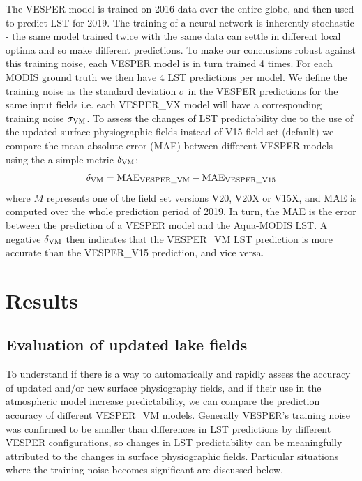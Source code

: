 \documentclass[hess, twostagejnl]{copernicus}
\begin{document}
The VESPER model is trained on 2016 data over the entire globe, and then used to predict LST for 2019. The training of a neural network is inherently stochastic - the same model trained twice with the same data can settle in different local optima and so make different predictions. To make our conclusions robust against this training noise, each VESPER model is in turn trained 4 times. For each MODIS ground truth we then have 4 LST predictions per model. We define the training noise as the standard deviation $\sigma$ in the VESPER predictions for the same input fields i.e. each VESPER\_VX model will have a corresponding training noise $\sigma_{\rm VM}$. To assess the changes of LST predictability due to the use of the updated surface physiographic fields instead of V15 field set (default) we compare the mean absolute error (MAE) between different VESPER models using the a simple metric $\delta_{\rm VM}$:
\begin{equation} 
	\delta_{\rm VM} = \text{MAE}_{\rm VESPER\_VM} - \text{MAE}_{\rm VESPER\_V15} 
\end{equation}
where $M$ represents one of the field set versions V20, V20X or V15X, and $\text{MAE}$ is computed over the whole prediction period of 2019. In turn, the MAE is the error between the prediction of a VESPER model and the Aqua-MODIS LST. A negative $\delta_{\rm VM}$ then indicates that the VESPER\_VM LST prediction is more accurate than the  VESPER\_V15 prediction, and vice versa.
\section{Results}

\subsection{Evaluation of updated lake fields}\label{sec:3}
To understand if there is a way to automatically and rapidly assess the accuracy of updated and/or new surface physiography fields, and if their use in the atmospheric model increase predictability, we can compare the prediction accuracy of different VESPER\_VM models. Generally VESPER’s training noise was confirmed to be smaller than differences in LST predictions by different VESPER configurations, so changes in LST predictability can be meaningfully attributed to the changes in surface physiographic fields. Particular situations where the training noise becomes significant are discussed below. \newline 
\end{document}
